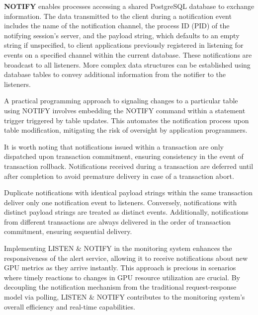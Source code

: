 
\textbf{NOTIFY} enables processes accessing a shared PostgreSQL database to exchange information. The data transmitted to the client during a notification event includes the name of the notification channel, the process ID (PID) of the notifying session's server, and the payload string, which defaults to an empty string if unspecified, to client applications previously registered in listening for events on a specified channel within the current database. These notifications are broadcast to all listeners. More complex data structures can be established using database tables to convey additional information from the notifier to the listeners. 

A practical programming approach to signaling changes to a particular table using NOTIFY involves embedding the NOTIFY command within a statement trigger triggered by table updates. This automates the notification process upon table modification, mitigating the risk of oversight by application programmers.

It is worth noting that notifications issued within a transaction are only dispatched upon transaction commitment, ensuring consistency in the event of transaction rollback. Notifications received during a transaction are deferred until after completion to avoid premature delivery in case of a transaction abort.

Duplicate notifications with identical payload strings within the same transaction deliver only one notification event to listeners. Conversely, notifications with distinct payload strings are treated as distinct events. Additionally, notifications from different transactions are always delivered in the order of transaction commitment, ensuring sequential delivery.

Implementing LISTEN \& NOTIFY in the monitoring system enhances the responsiveness of the alert service, allowing it to receive notifications about new GPU metrics as they arrive instantly. This approach is precious in scenarios where timely reactions to changes in GPU resource utilization are crucial. By decoupling the notification mechanism from the traditional request-response model via polling, LISTEN \& NOTIFY contributes to the monitoring system's overall efficiency and real-time capabilities.

